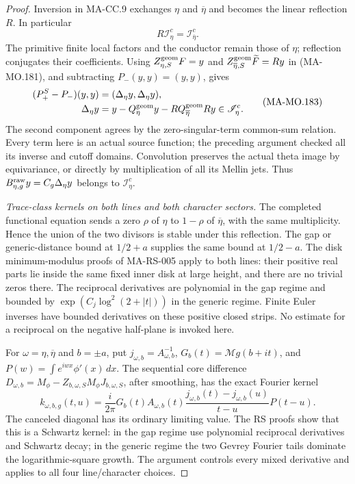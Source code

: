 \begin{proof}
Inversion in MA-CC.9 exchanges \(\eta\) and
\(\overline\eta\) and becomes the linear reflection \(R\).
In particular
\[
                 R\mathscr I^c_\eta=\mathscr I^c_{\overline\eta}.
 \tag{MA-MO.182}
\]
The primitive finite local factors and the conductor remain
those of \(\eta\); reflection conjugates their coefficients.
Using \(Z^{\rm geom}_{\eta,S}F=y\) and
\(Z^{\rm geom}_{\overline\eta,S}\widetilde F=Ry\) in
(MA-MO.181), and subtracting \(P_-(y,y)=(y,y)\), gives
\[
 \begin{aligned}
 (P_+^S-P_-)(y,y)&=(\Delta_\eta y,\Delta_\eta y),\\
 \Delta_\eta y&=y-Q^{\rm geom}_\eta y
                         -R Q^{\rm geom}_{\overline\eta}Ry
                                      \in\mathscr I^c_\eta.
 \end{aligned}
 \tag{MA-MO.183}
\]
The second component agrees by the zero-singular-term
common-sum relation. Every term here is an actual source
function; the preceding argument checked all its inverse
and cutoff domains. Convolution preserves the actual
theta image by equivariance, or directly by multiplication
of all its Mellin jets. Thus
\(B^{\rm raw}_{\eta,g}y=C_g\Delta_\eta y\) belongs to
\(\mathscr I^c_\eta\).

\emph{Trace-class kernels on both lines and both character sectors.}
The completed functional equation sends a zero \(\rho\) of
\(\eta\) to \(1-\rho\) of \(\overline\eta\), with the
same multiplicity. Hence the union of the two divisors is
stable under this reflection. The gap or generic-distance
bound at \(1/2+a\) supplies the same bound at \(1/2-a\).
The disk minimum-modulus proofs of MA-RS-005 apply to
both lines: their positive real parts lie inside the same
fixed inner disk at large height, and there are no trivial
zeros there. The reciprocal derivatives are polynomial
in the gap regime and bounded by
\(\exp(C_j\log^2(2+|t|))\) in the generic regime.
Finite Euler inverses have bounded derivatives on these
positive closed strips. No estimate for a reciprocal on
the negative half-plane is invoked here.

For \(\omega=\eta,\overline\eta\) and \(b=\pm a\), put
\(j_{\omega,b}=A_{\omega,b}^{-1}\),
\(G_b(t)=\mathcal Mg(b+it)\), and
\(P(w)=\int e^{iwx}\phi'(x)\,dx\). The sequential
core difference \(D_{\omega,b}=M_\phi-
Z_{b,\omega,S}M_\phi J_{b,\omega,S}\), after smoothing,
has the exact Fourier kernel
\[
 k_{\omega,b,g}(t,u)
   =\frac{i}{2\pi}G_b(t)A_{\omega,b}(t)
            \frac{j_{\omega,b}(t)-j_{\omega,b}(u)}{t-u}P(t-u).
 \tag{MA-MO.184}
\]
The canceled diagonal has its ordinary limiting value.
The RS proofs show that this is a Schwartz kernel: in the
gap regime use polynomial reciprocal derivatives and
Schwartz decay; in the generic regime the two Gevrey
Fourier tails dominate the logarithmic-square growth.
The argument controls every mixed derivative and applies
to all four line/character choices.


\end{proof}
